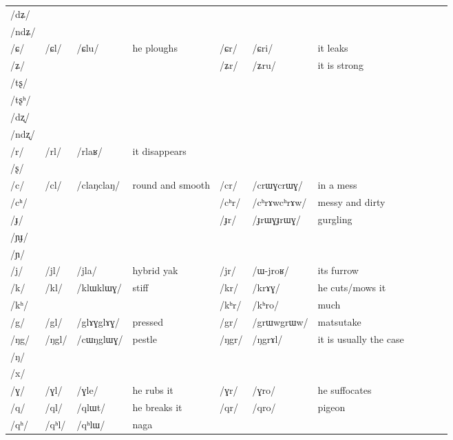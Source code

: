 \documentclass[oldfontcommands,oneside,a4paper,11pt]{article}
\newcommand{\ipa}[1]{\mbox{/#1/}} %
\newcommand{\deux}[1]{/#1/}
\newcommand{\tib}[1]{\cellcolor{lightgray}\textbf{#1}}
\newcommand{\idph}[1]{\cellcolor{gray}\textbf{#1}}
\begin{document}
\begin{landscape}
\begin{longtable}{l|lll|lll|lll|l}
\ipa{dʑ} 	&  	&  	&  	&  	&  	& \\	
\ipa{ndʑ} 	&  	&  	&  	&  	&  	& \\	
\ipa{ɕ} 	& \deux{ɕl} 	& \ipa{ɕlu} 	&he ploughs  	& \deux{ɕr} 	& \ipa{ɕri} 	& it leaks\\	
\ipa{ʑ} 	&  	&   	&  	& \deux{ʑr} 	& \ipa{ʑru} 	&it is strong \\	
\ipa{tʂ} 	&  	&  	&  	&  	&  	& \\	
\ipa{tʂʰ} 	&  	&  	&  	&  	&  	& \\	
\ipa{dʐ} 	&  	&  	&  	&  	&  	& \\	
\ipa{ndʐ} 	&  	&  	&  	&  	&  	& \\	
\ipa{r} 	& \deux{rl} 	& \ipa{rlaʁ} 	&it disappears  	&  	&  	& \\	
\ipa{ʂ} 	&  	&  	&  	&  	&  	& \\	
\ipa{c} 	& \deux{cl} \idph{}	& \ipa{claŋclaŋ} 	& round and smooth 	& \deux{cr} \idph{}	& \ipa{crɯɣcrɯɣ} 	& in a mess \\	
\ipa{cʰ} 	&  	&  	&  	& \deux{cʰr}\idph{} 	& \ipa{cʰrɤwcʰrɤw} 	& messy and dirty\\	
\ipa{ɟ} 	&  	&  	&  	& \deux{ɟr} \idph{}	& \ipa{ɟrɯɣɟrɯɣ} 	& gurgling\\	
\ipa{ɲɟ} 	&  	&  	&  	&  	&  	& \\	
\ipa{ɲ} 	&  	&  	&  	&  	&  	& \\	
\ipa{j} 	& \deux{jl} 	& \ipa{jla} 	& hybrid yak 	& \deux{jr} 	& \ipa{ɯ-jroʁ} 	&its furrow \\	
\ipa{k} 	& \deux{kl} 	& \ipa{klɯklɯɣ} 	&stiff  	& \deux{kr} 	& \ipa{krɤɣ} 	& he cuts/mows it\\	
\ipa{kʰ} 	&  	&  	&  	& \deux{kʰr} 	& \ipa{kʰro} 	&much \\	
\ipa{g} 	& \deux{gl} \idph{}	& \ipa{glɤɣglɤɣ} 	& pressed 	& \deux{gr} 	& \ipa{grɯwgrɯw} 	&matsutake \\	
\ipa{ŋg} 	& \deux{ŋgl} 	& \ipa{cɯŋglɯɣ} 	&pestle  	& \deux{ŋgr} 	& \ipa{ŋgrɤl} 	&it is usually the case \\	
\ipa{ŋ} 	&  	&  	&  	&  	&  	& \\	
\ipa{x} 	&  	&  	&  	&  	&  	& \\	
\ipa{ɣ} 	& \deux{ɣl} 	& \ipa{ɣle} 	&he rubs it  	& \deux{ɣr} 	& \ipa{ɣro} 	& he suffocates\\	
\ipa{q} 	& \deux{ql} 	& \ipa{qlɯt} 	& he breaks it 	& \deux{qr} 	& \ipa{qro} 	& pigeon\\	
\ipa{qʰ} 	& \deux{qʰl} \tib{}	& \ipa{qʰlɯ} 	&naga  	&  	&  	& \\	

\end{longtable}
\end{landscape}
\end{document}
